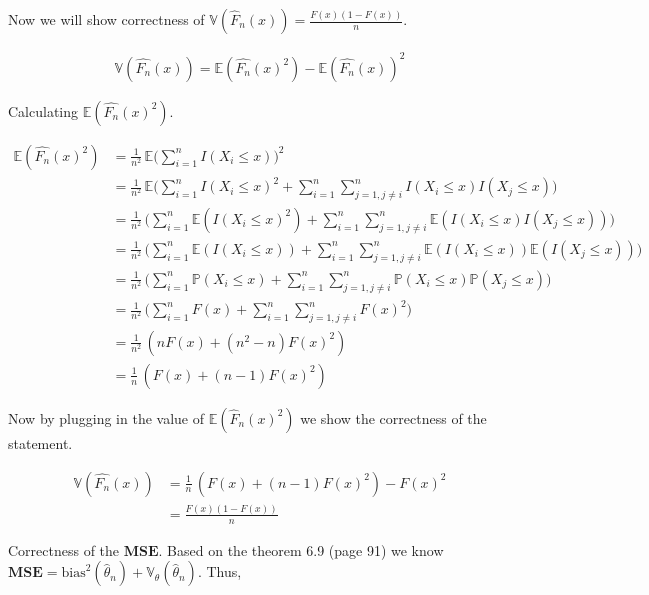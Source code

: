 \documentclass[12pt, a4paper]{book}
\begin{document}
Now we will show correctness of $\mathbb{V}(\hat{F}_n(x)) = \frac{F(x)(1-F(x))}{n}$.

\begin{eqnarray*}
    \mathbb{V}(\hat{F_n}(x)) = \mathbb{E}(\hat{F_n}(x)^2) - \mathbb{E}(\hat{F_n}(x))^2
\end{eqnarray*}

Calculating $\mathbb{E}(\hat{F_n}(x)^2)$.

\begin{align*}
    \mathbb{E}(\hat{F_n}(x)^2) & = \frac{1}{n^2} \, \mathbb{E} \big( \sum_{i = 1}^n I(X_i \leq x ) \big)^2 \\
    & = \frac{1}{n^2}  \, \mathbb{E} \Big( \sum_{i = 1}^n I(X_i \leq x )^2 + \sum_{i = 1}^n \sum_{j = 1, j \neq i}^n I(X_i \leq x ) I(X_j \leq x ) \Big) \\
    & = \frac{1}{n^2}  \, \Big( \sum_{i = 1}^n \mathbb{E} ( I(X_i \leq x )^2 ) + \sum_{i = 1}^n \sum_{j = 1, j \neq i}^n \mathbb{E} ( I(X_i \leq x ) I(X_j \leq x ) ) \Big) \\
    & = \frac{1}{n^2}  \, \Big( \sum_{i = 1}^n \mathbb{E} ( I(X_i \leq x ) ) + \sum_{i = 1}^n \sum_{j = 1, j \neq i}^n \mathbb{E} ( I(X_i \leq x ) ) \mathbb{E} ( I(X_j \leq x ) ) \Big) \\
    & = \frac{1}{n^2}  \, \Big( \sum_{i = 1}^n \mathbb{P}(X_i \leq x ) +  \sum_{i = 1}^n \sum_{j = 1, j \neq i}^n \mathbb{P}(X_i \leq x ) \mathbb{P}(X_j \leq x )  \Big) \\
    & = \frac{1}{n^2}  \, \Big( \sum_{i = 1}^n F(x) + \sum_{i = 1}^n \sum_{j = 1, j \neq i}^n F(x)^2  \Big) \\
    & = \frac{1}{n^2}  \, ( nF(x) + (n^2 - n)F(x)^2 ) \\
    & = \frac{1}{n} \, ( F(x) + (n - 1) F(x)^2 )
\end{align*}

Now by plugging in the value of $\mathbb{E}(\hat{F}_n(x)^2)$ we show the correctness of the statement.

\begin{align*}
    \mathbb{V}(\hat{F_n}(x)) & = \frac{1}{n} \, ( F(x) + (n - 1) F(x)^2 ) - F(x)^2 \\
    & = \frac{F(x)(1 - F(x))}{n}
\end{align*}

Correctness of the $\mathbf{M} \mathbf{S} \mathbf{E} $. Based on the theorem 6.9 (page 91) we know
$\mathbf{M} \mathbf{S} \mathbf{E} = \text{bias}^2(\hat{\theta}_n) + \mathbb{V}_\theta(\hat{\theta}_n)$. Thus,
\end{document}
